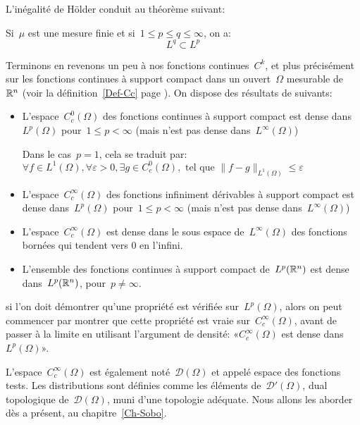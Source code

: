 L'inégalité de Hölder conduit au théorème suivant:
\begin{theoreme}
Si~$\mu$ est une mesure finie et si~$1\le p\le q\le \infty$, on a:
\begin{equation}L^q\subset L^p\end{equation}
\end{theoreme}

\medskip
Terminons en revenons un peu à nos fonctions continues~$C^k$, et plus précisément sur les fonctions continues à support compact
dans un ouvert~$\Omega$ mesurable de~$\mathbb R^n$ (voir la définition~\ref{Def-Cc} page \pageref{Def-Cc}).
On dispose des résultats de  suivants:
\begin{itemize}
  \item L'espace~$C_c^0(\Omega)$ des fonctions continues à support compact est dense dans~$L^p(\Omega)$ pour~$1\le p<\infty$
	(mais n'est pas dense dans~$L^\infty(\Omega)$)

	 Dans le cas~$p=1$, cela se traduit par: 	$ \forall f\in L^1(\Omega), \forall\varepsilon>0, \exists g\in C_ c^0(\Omega), \text{ tel que }
	  \|f-g\|_{L^1(\Omega)}\le\varepsilon$ 

  \item L'espace~$C_c^\infty(\Omega)$ des fonctions infiniment dérivables à support compact est dense dans~$L^p(\Omega)$ pour~$1\le p<\infty$
	(mais n'est pas dense dans~$L^\infty(\Omega)$)
  \item L'espace~$C_c^\infty(\Omega)$ est dense dans le sous espace de~$L^\infty(\Omega)$ des fonctions bornées qui tendent vers 0 en l'infini.
  \item L'ensemble des fonctions continues à support compact de~$L^p(\mathbb R^n)$ est dense dans~$L^p(\mathbb R^n)$, pour~$p\neq\infty$. 
\end{itemize}

si l'on doit démontrer qu'une propriété est vérifiée sur~$L^p(\Omega)$, alors on peut commencer par montrer que cette propriété est vraie sur~$C_c^\infty(\Omega)$, avant de passer à la limite en utilisant l'argument de densité: «$C_c^\infty(\Omega)$ est dense dans~$L^p(\Omega)$».

\medskip
L'espace~$C_c^{\infty}(\Omega)$ est également noté~$\mathcal{D}(\Omega)$ et appelé espace des fonctions tests. 
Les distributions sont définies comme les éléments de~$\mathcal{D}'(\Omega)$, dual topologique de~$\mathcal{D}(\Omega)$, muni d'une topologie adéquate.
Nous allons les aborder dès a présent, au chapitre~\ref{Ch-Sobo}.
